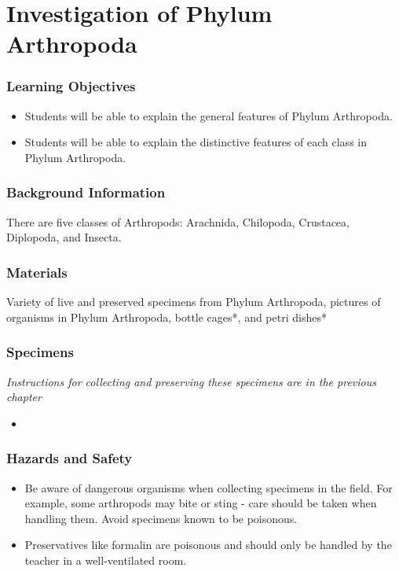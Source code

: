 \section{Investigation of Phylum Arthropoda}

\subsubsection*{Learning Objectives}
\begin{itemize}
\item{Students will be able to explain the general features of Phylum Arthropoda.}
\item{Students will be able to explain the distinctive features of each class in Phylum Arthropoda.}
\end{itemize}

\subsubsection*{Background Information}
There are five classes of Arthropods: Arachnida, Chilopoda, Crustacea, Diplopoda, and Insecta.

\subsubsection*{Materials}
Variety of live and preserved specimens from Phylum Arthropoda, pictures of organisms in Phylum Arthropoda, bottle cages*, and petri dishes*

\subsubsection*{Specimens}
\textit{Instructions for collecting and preserving these specimens are in the previous chapter}
\begin{itemize}
\item{}
\end{itemize}

\subsubsection*{Hazards and Safety}
\begin{itemize}
\item{Be aware of dangerous organisms when collecting specimens in the field. For example, some arthropods may bite or sting - care should be taken when handling them. Avoid specimens known to be poisonous.}
\item{Preservatives like formalin are poisonous and should only be handled by the teacher in a well-ventilated room.}
\end{itemize}

